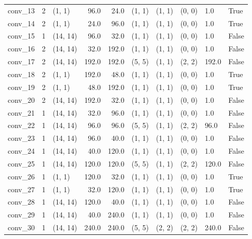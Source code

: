 \begin{center}
\begin{tabular}{lrlrrlllll}
        conv\_13 &      2 &      (1, 1) &   96.0 &    24.0 &  (1, 1) &  (1, 1) &  (0, 0) &    1.0 &   True \\
        conv\_14 &      2 &      (1, 1) &   24.0 &    96.0 &  (1, 1) &  (1, 1) &  (0, 0) &    1.0 &   True \\
        conv\_15 &      1 &    (14, 14) &   96.0 &    32.0 &  (1, 1) &  (1, 1) &  (0, 0) &    1.0 &  False \\
        conv\_16 &      2 &    (14, 14) &   32.0 &   192.0 &  (1, 1) &  (1, 1) &  (0, 0) &    1.0 &  False \\
        conv\_17 &      2 &    (14, 14) &  192.0 &   192.0 &  (5, 5) &  (1, 1) &  (2, 2) &  192.0 &  False \\
        conv\_18 &      2 &      (1, 1) &  192.0 &    48.0 &  (1, 1) &  (1, 1) &  (0, 0) &    1.0 &   True \\
        conv\_19 &      2 &      (1, 1) &   48.0 &   192.0 &  (1, 1) &  (1, 1) &  (0, 0) &    1.0 &   True \\
        conv\_20 &      2 &    (14, 14) &  192.0 &    32.0 &  (1, 1) &  (1, 1) &  (0, 0) &    1.0 &  False \\
        conv\_21 &      1 &    (14, 14) &   32.0 &    96.0 &  (1, 1) &  (1, 1) &  (0, 0) &    1.0 &  False \\
        conv\_22 &      1 &    (14, 14) &   96.0 &    96.0 &  (5, 5) &  (1, 1) &  (2, 2) &   96.0 &  False \\
        conv\_23 &      1 &    (14, 14) &   96.0 &    40.0 &  (1, 1) &  (1, 1) &  (0, 0) &    1.0 &  False \\
        conv\_24 &      1 &    (14, 14) &   40.0 &   120.0 &  (1, 1) &  (1, 1) &  (0, 0) &    1.0 &  False \\
        conv\_25 &      1 &    (14, 14) &  120.0 &   120.0 &  (5, 5) &  (1, 1) &  (2, 2) &  120.0 &  False \\
        conv\_26 &      1 &      (1, 1) &  120.0 &    32.0 &  (1, 1) &  (1, 1) &  (0, 0) &    1.0 &   True \\
        conv\_27 &      1 &      (1, 1) &   32.0 &   120.0 &  (1, 1) &  (1, 1) &  (0, 0) &    1.0 &   True \\
        conv\_28 &      1 &    (14, 14) &  120.0 &    40.0 &  (1, 1) &  (1, 1) &  (0, 0) &    1.0 &  False \\
        conv\_29 &      1 &    (14, 14) &   40.0 &   240.0 &  (1, 1) &  (1, 1) &  (0, 0) &    1.0 &  False \\
        conv\_30 &      1 &    (14, 14) &  240.0 &   240.0 &  (5, 5) &  (2, 2) &  (2, 2) &  240.0 &  False \\

\end{tabular}
\end{center}
